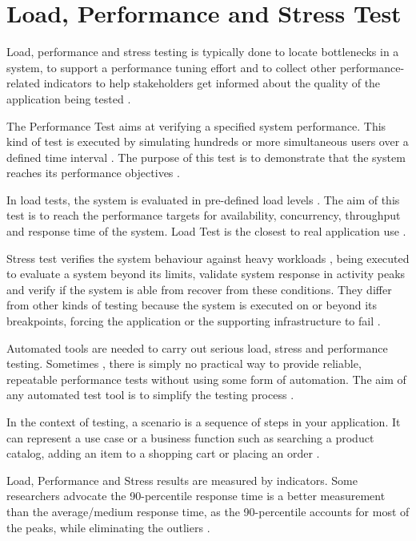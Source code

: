 \section{Load, Performance and Stress Test}

Load, performance and stress testing is typically done to locate bottlenecks in a system, to support a performance tuning effort and to collect other performance-related indicators to help stakeholders get informed about the quality of the application being tested \cite{Sandler2004} \cite{Corporation2007}. 

The Performance Test aims at verifying a specified system performance. This kind of test is executed by simulating hundreds or more simultaneous users  over a defined time interval \cite{DiLucca2006}. The purpose of this test is to demonstrate that the system  reaches its performance objectives \cite{Sandler2004}. 


In load tests, the system is evaluated in pre-defined load levels \cite{DiLucca2006}. The aim of this test is to reach the performance targets for availability, concurrency, throughput and response time of the system. Load Test is the closest to real application use \cite{Molyneaux2009}.

Stress test verifies the system behaviour against heavy workloads \cite{Sandler2004}, being executed to evaluate a system beyond its limits, validate system response in activity peaks and verify if the system is able from recover from these conditions. They differ from other kinds of testing  because the system is executed on or beyond its breakpoints, forcing the application or the supporting infrastructure to fail \cite{DiLucca2006} \cite{Molyneaux2009}.

Automated tools are needed to carry out serious load, stress and performance testing. Sometimes , there is simply no practical way to provide reliable, repeatable performance tests without using some form of automation. The aim of any automated test tool is to simplify the testing process \cite{Molyneaux2009}.

In the context of  testing, a scenario is a sequence of steps in your application. It can represent a use case or a business function such as searching a product catalog, adding an item to a shopping cart or placing an order \cite{Corporation2007}. 

Load, Performance and Stress results are measured by indicators. Some researchers advocate the 90-percentile response time is a better measurement than the average/medium response time, as the 90-percentile accounts for most of the peaks, while eliminating the outliers \cite{Jiang2010}.